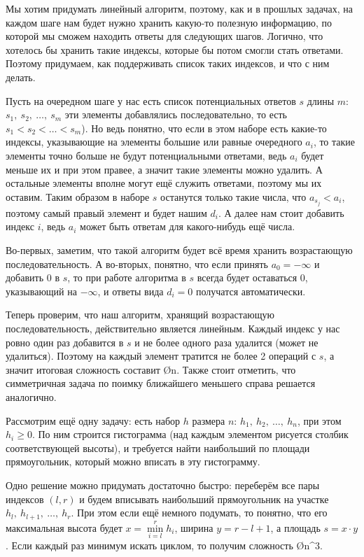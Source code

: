 Мы хотим придумать линейный алгоритм, поэтому, как и в прошлых задачах, на каждом шаге нам будет нужно хранить какую-то полезную информацию, по которой мы сможем находить ответы для следующих шагов. Логично, что хотелось бы хранить такие индексы, которые бы потом смогли стать ответами. Поэтому придумаем, как поддерживать список таких индексов, и что с ним делать.

Пусть на очередном шаге у нас есть список потенциальных ответов $s$ длины $m$: $s_1,\ s_2,\ \ldots,\ s_m$ эти элементы добавлялись последовательно, то есть $s_1 < s_2 < \ldots < s_m$). Но ведь понятно, что если в этом наборе есть какие-то индексы, указывающие на элементы большие или равные очередного $a_i$, то такие элементы точно больше не будут потенциальными ответами, ведь $a_i$ будет меньше их и при этом правее, а значит такие элементы можно удалить. А остальные элементы вполне могут ещё служить ответами, поэтому мы их оставим. Таким образом в наборе $s$ останутся только такие числа, что $a_{s_j} < a_i$, поэтому самый правый элемент и будет нашим $d_i$. А далее нам стоит добавить индекс $i$, ведь $a_i$ может быть ответам для какого-нибудь ещё числа.

Во-первых, заметим, что такой алгоритм будет всё время хранить возрастающую последовательность. А во-вторых, понятно, что если принять $a_0 = -\infty$ и добавить $0$ в $s$, то при работе алгоритма в $s$ всегда будет оставаться $0$, указывающий на $-\infty$, и ответы вида $d_i = 0$ получатся автоматически.

Теперь проверим, что наш алгоритм, хранящий возрастающую последовательность, действительно является линейным. Каждый индекс у нас ровно один раз добавится в $s$ и не более одного раза удалится (может не удалиться). Поэтому на каждый элемент тратится не более 2 операций с $s$, а значит итоговая сложность составит \O{n}. Также стоит отметить, что симметричная задача по поимку ближайшего меньшего справа решается аналогично.


Рассмотрим ещё одну задачу: есть набор $h$ размера $n$: $h_1,\ h_2,\ \ldots,\ h_n$, при этом $h_i \geq 0$. По ним строится гистограмма (над каждым элементом рисуется столбик соответствующей высоты), и требуется найти наибольший по площади прямоугольник, который можно вписать в эту гистограмму.

Одно решение можно придумать достаточно быстро: переберём все пары индексов $(l, r)$ и будем вписывать наибольший прямоугольник на участке $h_l,\ h_{l + 1},\ \ldots,\ h_r$. При этом если ещё немного подумать, то понятно, что его максимальная высота будет $x = \min\limits_{i = l}^{r} h_i$, ширина $y = r - l + 1$, а площадь $s = x \cdot y$. Если каждый раз минимум искать циклом, то получим сложность \O{n^3}.

